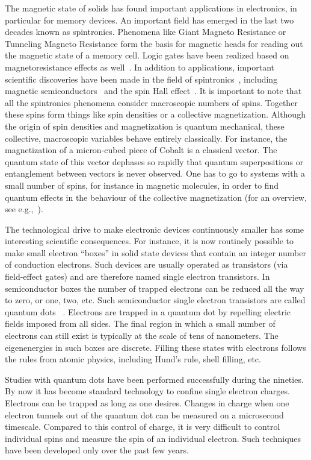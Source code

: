 \documentclass[12pt,aps,nofootinbib]{revtex4-1}
\begin{document}
The magnetic state of solids has found important applications in
electronics, in particular for memory devices. An important field
has emerged in the last two decades known as spintronics.
Phenomena like Giant Magneto Resistance or Tunneling Magneto
Resistance form the basis for magnetic heads for reading out the
magnetic state of a memory cell. Logic gates have been realized
based on magnetoresistance effects as well~\cite{wolf01,zutic04}.
In addition to applications, important scientific discoveries have been
made in the field of spintronics~\cite{awsch07}, including magnetic semiconductors~\cite{ohno98} and the spin Hall
effect~\cite{awschalom05}. It is important to note that all the
spintronics phenomena consider macroscopic numbers of spins.
Together these spins form things like spin densities or a
collective magnetization. Although the origin of spin densities
and magnetization is quantum mechanical, these collective,
macroscopic variables behave entirely classically. For instance, the
magnetization of a micron-cubed piece of Cobalt is a classical
vector. The quantum state of this vector dephases so rapidly that
quantum superpositions or entanglement between vectors is never
observed. One has to go to systems with a small number of spins,
for instance in magnetic molecules, in order to find quantum
effects in the behaviour of the collective
magnetization (for an overview, see e.g.,~\textcite{gunther91}).

The technological drive to make electronic devices continuously
smaller has some interesting scientific consequences. For
instance, it is now routinely possible to make small electron
``boxes'' in solid state devices that contain an integer number of
conduction electrons. Such devices are usually operated as
transistors (via field-effect gates) and are therefore named
single electron transistors. In semiconductor boxes the number of
trapped electrons can be reduced all the way to zero, or one, two,
etc. Such semiconductor single electron transistors are called
quantum dots ~\cite{kouwenhoven01}. Electrons are trapped in a quantum
dot by repelling electric fields imposed from all sides. The final
region in which a small number of electrons can still exist is
typically at the scale of tens of nanometers. The eigenenergies in
such boxes are discrete. Filling these states with electrons
follows the rules from atomic physics, including Hund's rule,
shell filling, etc. 

Studies with quantum dots have been performed successfully
during the nineties. By now it has become standard technology to confine single electron charges. Electrons
can be trapped as long as one desires. Changes in charge when one
electron tunnels out of the quantum dot can be measured on a
microsecond timescale. Compared to this control of charge, it is
very difficult to control individual spins and measure the spin of
an individual electron. Such techniques have been developed only
over the past few years.
\end{document}
